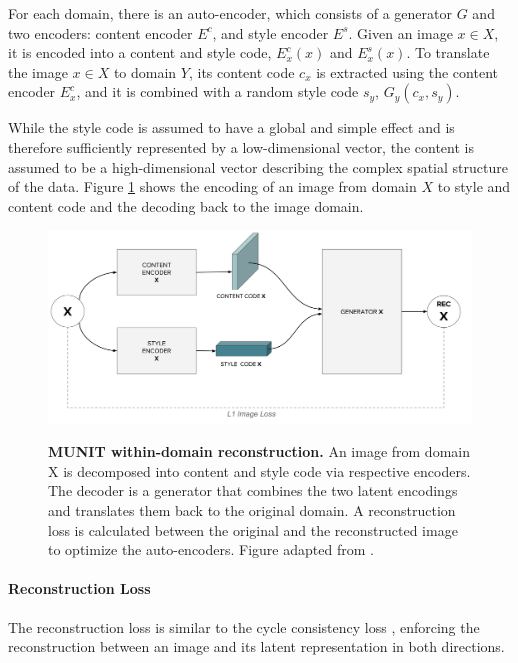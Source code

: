 \documentclass[12pt]{report}
\begin{document}
For each domain, there is an auto-encoder, which consists of a generator $G$ and two encoders: content encoder $E^c$, and style encoder $E^s$. Given an image $x \in X$, it is encoded into a content and style code, $E^c_x(x)$ and $E^s_x(x)$. To translate the image $x \in X$ to domain $Y$, its content code $c_{x}$ is extracted using the content encoder $E^c_x$, and it is combined with a random style code $s_{y}$, $G_y(c_x, s_y)$. 

While the style code is assumed to have a global and simple effect and is therefore sufficiently represented by a low-dimensional vector, the content is assumed to be a high-dimensional vector describing the complex spatial structure of the data. Figure \ref{fig:munit_enc} shows the encoding of an image from domain $X$ to style and content code and the decoding back to the image domain.

\begin{figure}[h]
\centering
{\includegraphics[width=\linewidth]{03_analysis/gans/munit_enc}}
\caption{\label{fig:munit_enc} \textbf{MUNIT within-domain reconstruction.}  An image from domain X is decomposed into content and style code via respective encoders. The decoder is a generator that combines the two latent encodings and translates them back to the original domain. A reconstruction loss is calculated between the original and the reconstructed image to optimize the auto-encoders. Figure adapted from \cite{huang_multimodal_2018}.}
\end{figure}

\paragraph{Reconstruction Loss}
The reconstruction loss is similar to the cycle consistency loss \cite{zhu_unpaired_2017}, enforcing the reconstruction between an image and its latent representation in both directions. 
\end{document}
